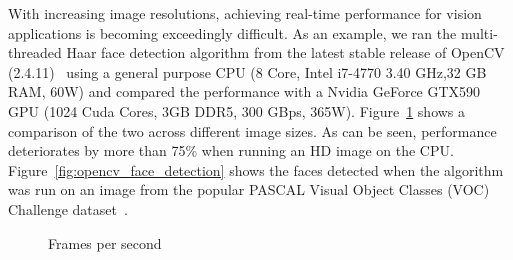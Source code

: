 With increasing image resolutions, achieving real-time performance for vision applications is becoming exceedingly difficult. 
As an example, we ran the multi-threaded Haar face detection algorithm from the latest 
stable release of OpenCV (2.4.11)~\cite{OpenCV} using 
a general purpose CPU (8 Core, Intel i7-4770 3.40 GHz,32 GB RAM, 60W) and compared the performance with 
a Nvidia GeForce GTX590 GPU (1024 Cuda Cores, 3GB DDR5, 300 GBps, 365W). Figure~\ref{fig:face_fps} shows a comparison of the two across different image sizes.
As can be seen, performance deteriorates by more than 75\% when running an HD image on the CPU.
Figure~\ref{fig:opencv_face_detection} shows the faces detected when the algorithm was run on an image 
from the popular PASCAL Visual Object Classes (VOC) Challenge dataset~\cite{Everingham2010}.

\begin{figure}[!htb]
\centering
{}
\caption{Frames per second}
\label{fig:face_fps}
\end{figure}

